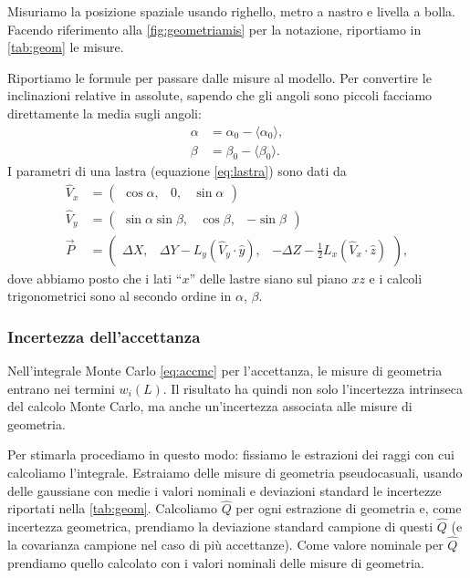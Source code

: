 Misuriamo la posizione spaziale usando righello, metro a nastro e livella a bolla.
Facendo riferimento alla \autoref{fig:geometriamis} per la notazione, riportiamo
in \autoref{tab:geom} le misure.

Riportiamo le formule per passare dalle misure al modello.
Per convertire le inclinazioni relative in assolute,
sapendo che gli angoli sono piccoli facciamo direttamente la media sugli angoli:
\begin{align*}
	\alpha &= \alpha_0 - \langle\alpha_0\rangle, \\
	\beta  &= \beta_0  - \langle\beta_0\rangle.
\end{align*}
I parametri di una lastra (equazione \ref{eq:lastra}) sono dati da
\begin{align*}
	\hat V_x &= \begin{pmatrix}
		\cos\alpha, & 0, & \sin\alpha
	\end{pmatrix} \\
	\hat V_y &= \begin{pmatrix}
		\sin\alpha\sin\beta, & \cos\beta, & -\sin\beta
	\end{pmatrix} \\
	\vec P &= \begin{pmatrix}
		\Delta X, & \Delta Y - L_y(\hat V_y\cdot\hat y), & -\Delta Z - \frac12 L_x(\hat V_x\cdot\hat z)
	\end{pmatrix},
\end{align*}
dove abbiamo posto che i lati ``$x$'' delle lastre siano sul piano $xz$
e i calcoli trigonometrici sono al secondo ordine in $\alpha$, $\beta$.

\subsubsection{Incertezza dell'accettanza}

Nell'integrale Monte Carlo \eqref{eq:accmc} per l'accettanza,
le misure di geometria entrano nei termini $w_i(L)$.
Il risultato ha quindi non solo l'incertezza intrinseca del calcolo Monte Carlo,
ma anche un'incertezza associata alle misure di geometria.

Per stimarla procediamo in questo modo:
fissiamo le estrazioni dei raggi con cui calcoliamo l'integrale.
Estraiamo delle misure di geometria pseudocasuali,
usando delle gaussiane con medie i valori nominali e deviazioni standard le incertezze
riportati nella \autoref{tab:geom}.
Calcoliamo $\hat Q$ per ogni estrazione di geometria e, come incertezza geometrica,
prendiamo la deviazione standard campione di questi $\hat Q$
(e la covarianza campione nel caso di più accettanze).
Come valore nominale per $\hat Q$ prendiamo quello calcolato con i valori nominali delle misure di geometria.
